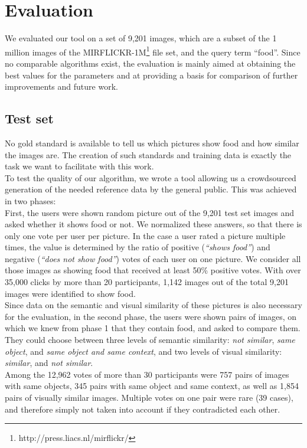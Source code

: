 %
\section{Evaluation}
\label{sec_evaluation}

We evaluated our tool on a set of 9,201 images, which are a subset of the 1 million images of the MIRFLICKR-1M\footnote{http://press.liacs.nl/mirflickr/} file set, and the query term ``food''. Since no comparable algorithms exist, the evaluation is mainly aimed at obtaining the best values for the parameters and at providing a basis for comparison of further improvements and future work.

\subsection{Test set}
\label{sec_testset}
No gold standard is available to tell us which pictures show food and how similar the images are. The creation of such standards and training data is exactly the task we want to facilitate with this work.\\ 
To test the quality of our algorithm, we wrote a tool allowing us a crowdsourced generation of the needed reference data by the general public. This was achieved in two phases:\\

First, the users were shown random picture out of the 9,201 test set images and asked whether it shows food or not. We normalized these answers, so that there is only one vote per user per picture. In the case a user rated a picture multiple times, the value is determined by the ratio of positive (\emph{``shows food''}) and negative (\emph{``does not show food''}) votes of each user on one picture. We consider all those images as showing food that received at least 50\% positive votes. With over 35,000 clicks by more than 20 participants, 1,142 images out of the total 9,201 images were identified to show food. \\

Since data on the semantic and visual similarity of these pictures is also necessary for the evaluation, in the second phase, the users were shown pairs of images, on which we knew from phase 1 that they contain food, and asked to compare them. They could choose between three levels of semantic similarity: \emph{not similar}, \emph{same object}, and \emph{same object and same context}, and two levels of visual similarity: \emph{similar}, and \emph{not similar}.\\
Among the 12,962 votes of more than 30 participants were 757 pairs of images with same objects, 345 pairs with same object and same context, as well as 1,854 pairs of visually similar images. Multiple votes on one pair were rare (39 cases), and therefore simply not taken into account if they contradicted each other.

